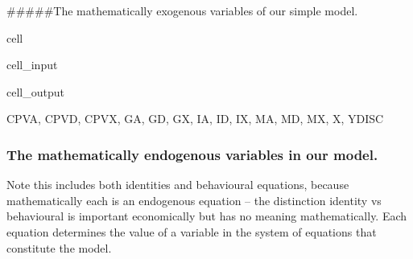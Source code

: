 \documentclass[letterpaper,10pt,english]{jupyterBook}
\begin{document}
\sphinxAtStartPar
\#\#\#\#\#The mathematically exogenous variables of our simple model.

\begin{sphinxuseclass}{cell}\begin{sphinxVerbatimInput}

\begin{sphinxuseclass}{cell_input}
\begin{sphinxVerbatim}[commandchars=\\\{\}]
\end{sphinxVerbatim}

\end{sphinxuseclass}\end{sphinxVerbatimInput}
\begin{sphinxVerbatimOutput}

\begin{sphinxuseclass}{cell_output}
\begin{sphinxVerbatim}[commandchars=\\\{\}]
\PYGZob{}\PYGZsq{}CPV\PYGZus{}A\PYGZsq{},
 \PYGZsq{}CPV\PYGZus{}D\PYGZsq{},
 \PYGZsq{}CPV\PYGZus{}X\PYGZsq{},
 \PYGZsq{}G\PYGZus{}A\PYGZsq{},
 \PYGZsq{}G\PYGZus{}D\PYGZsq{},
 \PYGZsq{}G\PYGZus{}X\PYGZsq{},
 \PYGZsq{}I\PYGZus{}A\PYGZsq{},
 \PYGZsq{}I\PYGZus{}D\PYGZsq{},
 \PYGZsq{}I\PYGZus{}X\PYGZsq{},
 \PYGZsq{}M\PYGZus{}A\PYGZsq{},
 \PYGZsq{}M\PYGZus{}D\PYGZsq{},
 \PYGZsq{}M\PYGZus{}X\PYGZsq{},
 \PYGZsq{}X\PYGZsq{},
 \PYGZsq{}YDISC\PYGZsq{}\PYGZcb{}
\end{sphinxVerbatim}

\end{sphinxuseclass}\end{sphinxVerbatimOutput}

\end{sphinxuseclass}

\subsubsection{The mathematically endogenous variables in our model.}
\label{\detokenize{content/05_SimpleModel/SimpleModel:the-mathematically-endogenous-variables-in-our-model}}
\sphinxAtStartPar
Note this includes both identities and behavioural equations, because mathematically each is an endogenous equation – the distinction identity vs behavioural is important economically but has no meaning mathematically.  Each equation determines the value of a variable in the system of equations that constitute the model.
\end{document}

